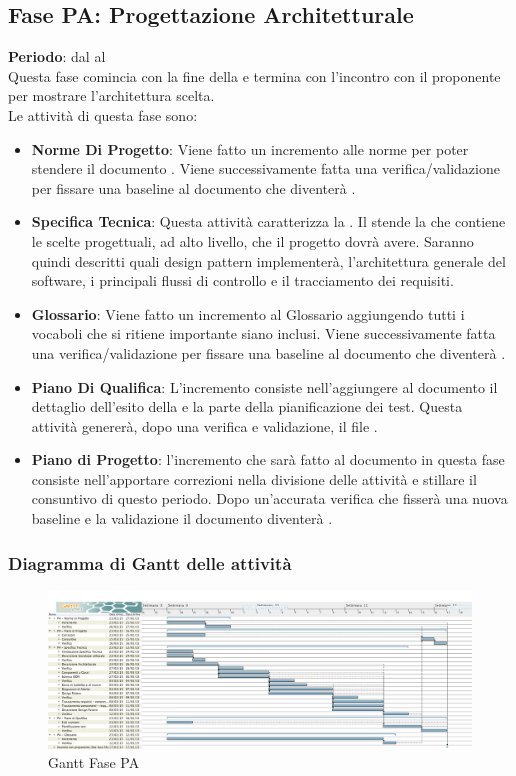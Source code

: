 \subsection{Fase PA: Progettazione Architetturale}
	\textbf{Periodo}: dal  al  \\Questa fase comincia con la fine della  e termina con l'incontro con il proponente per mostrare l'architettura scelta. \\Le attività di questa fase sono:
	\begin{itemize}
		\item \textbf{Norme Di Progetto}: Viene fatto un incremento alle norme per poter stendere il documento . Viene successivamente fatta una verifica/validazione per fissare una baseline al documento che diventerà .
		\item \textbf{Specifica Tecnica}: Questa attività caratterizza la . Il  stende la  che contiene le scelte progettuali, ad alto livello, che il progetto dovrà avere. Saranno quindi descritti quali design pattern \projectname{} implementerà, l'architettura generale del software, i principali flussi di controllo e il tracciamento dei requisiti.
		\item \textbf{Glossario}: Viene fatto un incremento al Glossario aggiungendo tutti i vocaboli che si ritiene importante siano inclusi. Viene successivamente fatta una verifica/validazione per fissare una baseline al documento che diventerà .
		\item \textbf{Piano Di Qualifica}: L'incremento consiste nell'aggiungere al documento  il dettaglio dell'esito della  e la parte della pianificazione dei test. Questa attività genererà, dopo una verifica e validazione, il file .
		\item \textbf{Piano di Progetto}: l'incremento che sarà fatto al documento  in questa fase consiste nell'apportare correzioni nella divisione delle attività e stillare il consuntivo di questo periodo. Dopo un'accurata verifica che fisserà una nuova baseline e la validazione il documento diventerà .
	\end{itemize}
	\subsubsection{Diagramma di Gantt delle attività}
	\begin{figure}\centering
		\includegraphics[width=\textwidth]{PianoDiProgetto/Pics/FasePA.png}
	\caption{Gantt Fase PA}
\end{figure}
